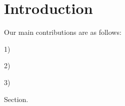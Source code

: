 \section{Introduction}
\label{sec:intro}
Our main contributions are as follows:

1)

2)

3)

Section.